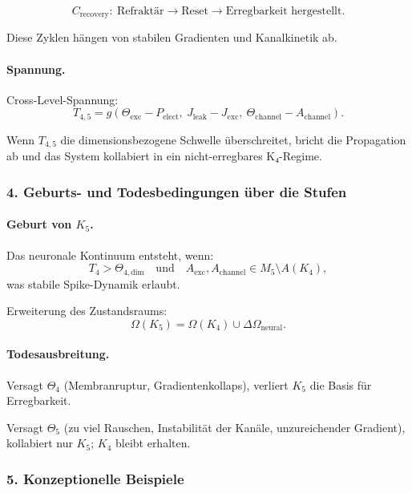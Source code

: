\[
C_{\mathrm{recovery}}:\ \text{Refraktär} \rightarrow \text{Reset}
\rightarrow \text{Erregbarkeit hergestellt}.
\]

Diese Zyklen hängen von stabilen Gradienten und Kanalkinetik ab.

\paragraph{Spannung.}
Cross-Level-Spannung:
\[
T_{4,5} =
g(\Theta_{\mathrm{exc}} - P_{\mathrm{elect}},\
  J_{\mathrm{leak}} - J_{\mathrm{exc}},\
  \Theta_{\mathrm{channel}} - A_{\mathrm{channel}}).
\]

Wenn $T_{4,5}$ die dimensionsbezogene Schwelle überschreitet, bricht die
Propagation ab und das System kollabiert in ein nicht-erregbares K₄-Regime.

\subsubsection{4. Geburts- und Todesbedingungen über die Stufen}

\paragraph{Geburt von \texorpdfstring{$K_5$}{K_5}.}
Das neuronale Kontinuum entsteht, wenn:
\[
T_4 > \Theta_{4,\mathrm{dim}}
\quad\text{und}\quad
A_{\mathrm{exc}}, A_{\mathrm{channel}} \in M_5 \setminus A(K_4),
\]
was stabile Spike-Dynamik erlaubt.

Erweiterung des Zustandsraums:
\[
\Omega(K_5) = \Omega(K_4) \cup \Delta\Omega_{\mathrm{neural}}.
\]

\paragraph{Todesausbreitung.}
Versagt $\Theta_4$ (Membranruptur, Gradientenkollaps), verliert $K_5$ die Basis
für Erregbarkeit.

Versagt $\Theta_5$ (zu viel Rauschen, Instabilität der Kanäle,
unzureichender Gradient), kollabiert nur $K_5$; $K_4$ bleibt erhalten.

\subsubsection{5. Konzeptionelle Beispiele}

